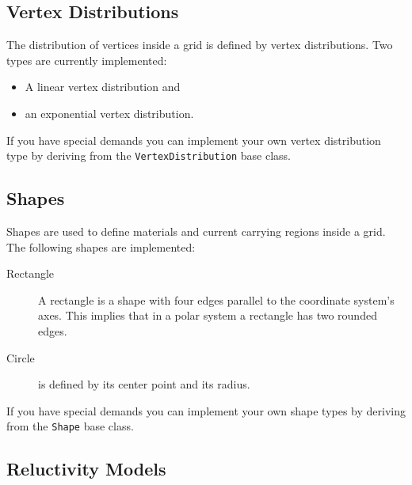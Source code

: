 \subsection{Vertex Distributions}

The distribution of vertices inside a grid is defined by vertex
distributions.  Two types are currently implemented:
\begin{itemize}
\item A linear vertex distribution and
\item an exponential vertex distribution.
\end{itemize}
If you have special demands you can implement your own vertex
distribution type by deriving from the \texttt{VertexDistribution}
base class.


\subsection{Shapes}

Shapes are used to define materials and current carrying regions
inside a grid.  The following shapes are implemented:
\begin{description}
\item[Rectangle] A rectangle is a shape with four edges parallel to
  the coordinate system's axes.  This implies that in a polar system a
  rectangle has two rounded edges.
\item[Circle] is defined by its center point and its radius.
\end{description}
If you have special demands you can implement your own shape types by
deriving from the \texttt{Shape} base class.

\subsection{Reluctivity Models}
\label{sec:material-models}

